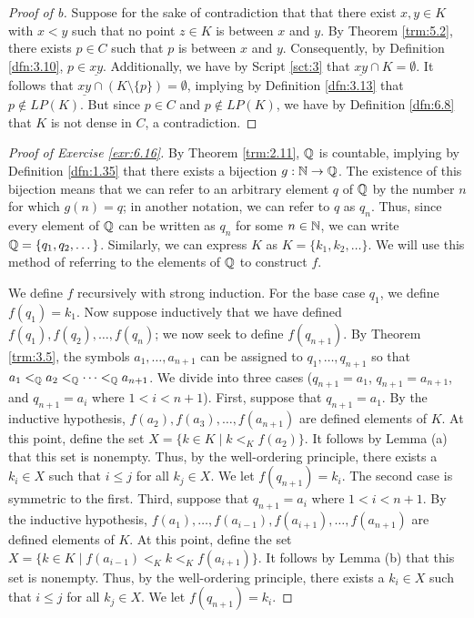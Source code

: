 \documentclass[../main.tex]{subfiles}
\begin{document}
\begin{exercise}
\begin{lemma*}
\begin{proof}[Proof of b]
            Suppose for the sake of contradiction that that there exist $x,y\in K$ with $x<y$ such that no point $z\in K$ is between $x$ and $y$. By Theorem \ref{trm:5.2}, there exists $p\in C$ such that $p$ is between $x$ and $y$. Consequently, by Definition \ref{dfn:3.10}, $p\in\underline{xy}$. Additionally, we have by Script \ref{sct:3} that $\underline{xy}\cap K=\emptyset$. It follows that $\underline{xy}\cap(K\setminus\{p\})=\emptyset$, implying by Definition \ref{dfn:3.13} that $p\notin LP(K)$. But since $p\in C$ and $p\notin LP(K)$, we have by Definition \ref{dfn:6.8} that $K$ is not dense in $C$, a contradiction.
        \end{proof}
    \end{lemma*}
    \begin{proof}[Proof of Exercise \ref{exr:6.16}]
        By Theorem \ref{trm:2.11}, $\mathbb{Q}$ is countable, implying by Definition \ref{dfn:1.35} that there exists a bijection $g:\mathbb{N}\to\mathbb{Q}$. The existence of this bijection means that we can refer to an arbitrary element $q$ of $\mathbb{Q}$ by the number $n$ for which $g(n)=q$; in another notation, we can refer to $q$ as $q_n$. Thus, since every element of $\mathbb{Q}$ can be written as $q_n$ for some $n\in\mathbb{N}$, we can write $\mathbb{Q}=\{q_1,q_2,\dots\}$. Similarly, we can express $K$ as $K=\{k_1,k_2,\dots\}$. We will use this method of referring to the elements of $\mathbb{Q}$ to construct $f$.\par
        We define $f$ recursively with strong induction. For the base case $q_1$, we define $f(q_1)=k_1$. Now suppose inductively that we have defined $f(q_1),f(q_2),\dots,f(q_n)$; we now seek to define $f(q_{n+1})$. By Theorem \ref{trm:3.5}, the symbols $a_1,\dots,a_{n+1}$ can be assigned to $q_1,\dots,q_{n+1}$ so that $a_1<_{\mathbb{Q}} a_2<_{\mathbb{Q}} \cdots<_{\mathbb{Q}} a_{n+1}$. We divide into three cases ($q_{n+1}=a_1$, $q_{n+1}=a_{n+1}$, and $q_{n+1}=a_i$ where $1<i<n+1$). First, suppose that $q_{n+1}=a_1$. By the inductive hypothesis, $f(a_2),f(a_3),\dots,f(a_{n+1})$ are defined elements of $K$. At this point, define the set $X=\{k\in K\mid k<_Kf(a_2)\}$. It follows by Lemma (a) that this set is nonempty. Thus, by the well-ordering principle, there exists a $k_i\in X$ such that $i\leq j$ for all $k_j\in X$. We let $f(q_{n+1})=k_i$. The second case is symmetric to the first. Third, suppose that $q_{n+1}=a_i$ where $1<i<n+1$. By the inductive hypothesis, $f(a_1),\dots,f(a_{i-1}),f(a_{i+1}),\dots,f(a_{n+1})$ are defined elements of $K$. At this point, define the set $X=\{k\in K\mid f(a_{i-1})<_Kk<_Kf(a_{i+1})\}$. It follows by Lemma (b) that this set is nonempty. Thus, by the well-ordering principle, there exists a $k_i\in X$ such that $i\leq j$ for all $k_j\in X$. We let $f(q_{n+1})=k_i$.\par

\end{proof}
\end{exercise}
\end{document}
